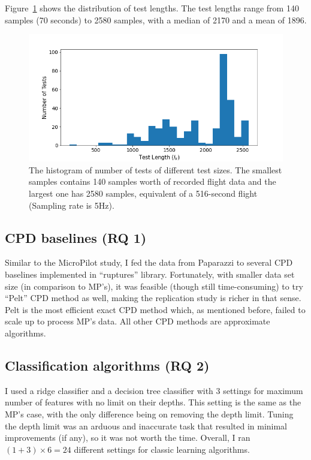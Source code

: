 Figure~\ref{fig:paparazzi_test_length} shows the distribution of test lengths. The test lengths range from 140 samples (70 seconds) to 2580 samples, with a median of 2170 and a mean of 1896.
\begin{figure}
    \centering
    \includegraphics[width=\columnwidth]{6_files/test_lengths.png}
    \caption{The histogram of number of tests of different test sizes. The smallest samples contains 140 samples worth of recorded flight data and the largest one has 2580 samples, equivalent of a 516-second flight (Sampling rate is 5Hz). }
    \label{fig:paparazzi_test_length}
\end{figure}


\subsection{CPD baselines (RQ 1)}
Similar to the MicroPilot study, I fed the data from Paparazzi to several CPD baselines implemented in ``ruptures'' library.
Fortunately, with smaller data set size (in comparison to MP's), it was feasible (though still time-consuming) to try ``Pelt'' CPD method \cite{killick2012optimal} as well, making the replication study is richer in that sense. Pelt is the most efficient exact CPD method which, as mentioned before, failed to scale up to process MP's data. All other CPD methods are approximate algorithms.

\subsection{Classification algorithms (RQ 2)}
I used a ridge classifier and a decision tree classifier with 3 settings for maximum number of features with no limit on their depths. This setting is the same as the MP's case, with the only difference being on removing the depth limit. Tuning the depth limit was an arduous and inaccurate task that resulted in minimal improvements (if any), so it was not worth the time. Overall, I ran $(1+3)\times6=24$ different settings for classic learning algorithms. 

